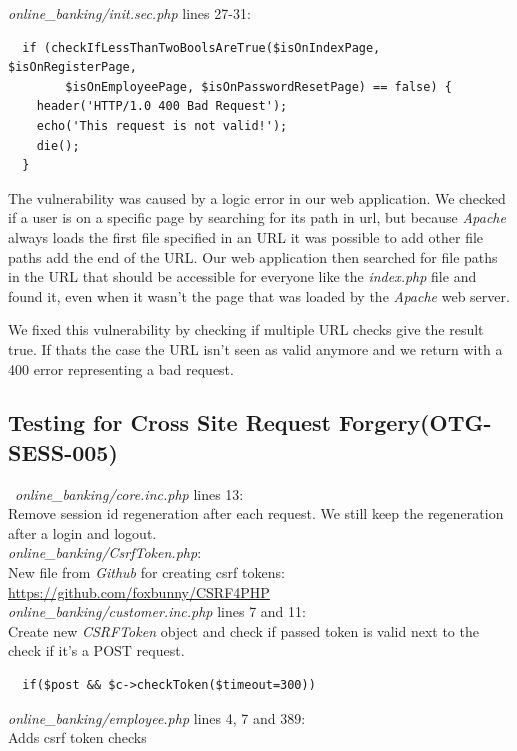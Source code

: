 \documentclass[headsepline,footsepline,footinclude=false,oneside,fontsize=11pt,paper=a4,listof=totoc,bibliography=totoc]{scrbook} %
\begin{document}
\textit{online\_banking/init.sec.php} lines 27-31:
\begin{lstlisting} 
  if (checkIfLessThanTwoBoolsAreTrue($isOnIndexPage, $isOnRegisterPage, 
  		$isOnEmployeePage, $isOnPasswordResetPage) == false) {
    header('HTTP/1.0 400 Bad Request');
    echo('This request is not valid!');
    die();
  }
\end{lstlisting} 

The vulnerability was caused by a logic error in our web application. We checked if a user is on a specific page by searching for its path in url, but because \textit{Apache} always loads the first file specified in an URL it was possible to add other file paths add the end of the URL. Our web application then searched for file paths in the URL that should be accessible for everyone like the \textit{index.php} file and found it, even when it wasn't the page that was loaded by the \textit{Apache} web server.

We fixed this vulnerability by checking if multiple URL checks give the result true. If thats the case the URL isn't seen as valid anymore and we return with a 400 error representing a bad request.

\subsection{Testing for Cross Site Request Forgery(OTG-SESS-005)}\
\textit{online\_banking/core.inc.php} lines 13:\\
Remove session id regeneration after each request. We still keep the regeneration after a login and logout.\\

\textit{online\_banking/CsrfToken.php}:\\
New file from \textit{Github} for creating csrf tokens: \url{https://github.com/foxbunny/CSRF4PHP}\\

\textit{online\_banking/customer.inc.php} lines 7 and 11:\\
Create new \textit{CSRFToken} object and check if passed token is valid next to the check if it's a POST request.
\begin{lstlisting} 
  if($post && $c->checkToken($timeout=300))
\end{lstlisting} 

\textit{online\_banking/employee.php} lines 4, 7 and 389:\\
Adds csrf token checks\\
\end{document}
